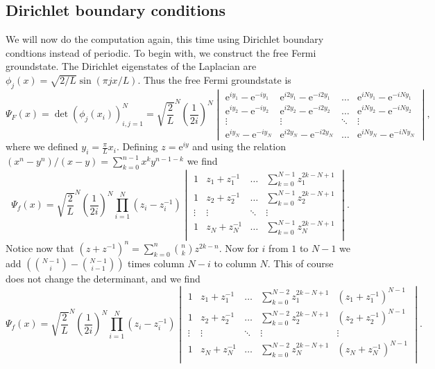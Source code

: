 \documentclass[a4paper,11pt]{article}
\newcommand{\euler}[1]{\text{e}^{#1}}
\numberwithin{equation}{section}
\begin{document}
	\subsection{Dirichlet boundary conditions}
	We will now do the computation again, this time using Dirichlet boundary condtions instead of periodic. To begin with, we construct the free Fermi groundstate. The Dirichlet eigenstates of the Laplacian are $ \phi_j(x)=\sqrt{2/L}\sin(\pi j x/L) $. Thus the free Fermi groundstate is \begin{equation}
	\Psi_F(x)=\det\left(\phi_j(x_i)\right)_{i,j=1}^{N}=\sqrt{\frac{2}{L}}^N\left(\frac{1}{2i}\right)^N\begin{vmatrix}
	\euler{iy_1}-\euler{-iy_1}&\euler{i2y_1}-\euler{-i2y_1}&\ldots&\euler{iNy_1}-\euler{-iNy_1}\\
	\euler{iy_2}-\euler{-iy_2}&\euler{i2y_2}-\euler{-i2y_2}&\ldots&\euler{iNy_2}-\euler{-iNy_2}\\
	\vdots&\vdots&\ddots&\vdots\\
	\euler{iy_N}-\euler{-iy_N}&\euler{i2y_N}-\euler{-i2y_N}&\ldots&\euler{iNy_N}-\euler{-iNy_N}
	\end{vmatrix},
	\end{equation}
	where we defined $ y_i=\frac{\pi}{L}x_i $. Defining $ z=\euler{iy} $ and using the relation $ (x^n-y^n)/(x-y)=\sum_{k=0}^{n-1}x^ky^{n-1-k} $ we find\begin{equation}
	\Psi_f(x)=\sqrt{\frac{2}{L}}^N\left(\frac{1}{2i}\right)^N\prod_{i=1}^{N}(z_i-z_i^{-1})\begin{vmatrix}
	1&z_1+z_1^{-1}&\ldots&\sum_{k=0}^{N-1}z_1^{2k-N+1}\\
	1&z_2+z_2^{-1}&\ldots&\sum_{k=0}^{N-1}z_2^{2k-N+1}\\
	\vdots&\vdots&\ddots&\vdots\\
	1&z_N+z_N^{-1}&\ldots&\sum_{k=0}^{N-1}z_N^{2k-N+1}\\
	\end{vmatrix}.
	\end{equation}
	Notice now that $ (z+z^{-1})^n=\sum_{k=0}^{n}\binom{n}{k}z^{2k-n} $.
	Now for $ i $ from $ 1 $ to $ N-1 $ we add $ \left(\binom{N-1}{i}-\binom{N-1}{i-1}\right) $ times column $ N-i $ to column $ N $. This of course does not change the determinant, and we find \begin{equation}
	\Psi_f(x)=\sqrt{\frac{2}{L}}^N\left(\frac{1}{2i}\right)^N\prod_{i=1}^{N}(z_i-z_i^{-1})\begin{vmatrix}
	1&z_1+z_1^{-1}&\ldots&\sum_{k=0}^{N-2}z_1^{2k-N+1}&(z_1+z_1^{-1})^{N-1}\\
	1&z_2+z_2^{-1}&\ldots&\sum_{k=0}^{N-2}z_2^{2k-N+1}&(z_2+z_2^{-1})^{N-1}\\
	\vdots&\vdots&\ddots&\vdots&\vdots\\
	1&z_N+z_N^{-1}&\ldots&\sum_{k=0}^{N-2}z_N^{2k-N+1}&(z_N+z_N^{-1})^{N-1}\\
	\end{vmatrix}.
	\end{equation}
\end{document}
